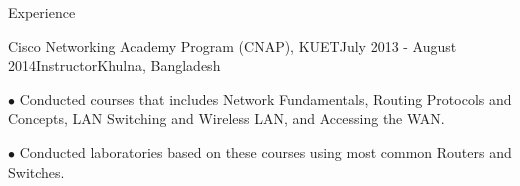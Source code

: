 \documentclass{resume} %
\begin{document}
\begin{rSection}{Experience}
\begin{rSubsection}{Cisco Networking Academy Program (CNAP), KUET}{July 2013 - August 2014}{Instructor}{Khulna, Bangladesh}
\item[$\bullet$] Conducted courses that includes Network Fundamentals, Routing Protocols and Concepts, LAN Switching and Wireless LAN, and Accessing the WAN. 
\item[$\bullet$] Conducted laboratories based on these courses using most common Routers and Switches. 	
\end{rSubsection}

\end{rSection}
\end{document}
